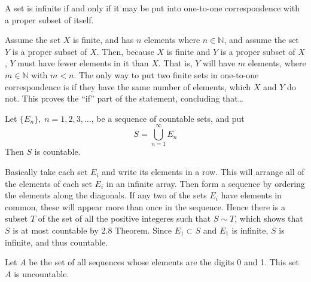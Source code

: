 \begin{prop-dan}
  A set is infinite if and only if it may be put into one-to-one correspondence with a proper subset of itself.
\end{prop-dan}

\begin{proof-dan}
  Assume the set $X$ is finite, and has $n$ elements where $n\in\mathbb{N}$, and assume the set $Y$ is a proper subset of $X$.
  Then, because $X$ is finite and $Y$ is a proper subset of $X$, $Y$ must have fewer elements in it than $X$.
  That is, $Y$ will have $m$ elements, where $m\in\mathbb{N}$ with $m<n$.
  The only way to put two finite sets in one-to-one correspondence is if they have the same number of elements, which $X$ and $Y$ do not.
  This proves the ``if'' part of the statement, concluding that\ldots
\end{proof-dan}

\begin{thm-dan}[2.12]
  Let $\{E_{n}\},\;n=1,2,3,\dots$, be a sequence of countable sets, and put
  \begin{equation*}
    S=\bigcup_{n=1}^{\infty}E_{n}
  \end{equation*}
  Then $S$ is countable.
\end{thm-dan}

\begin{proof-dan}
  Basically take each set $E_{i}$ and write its elements in a row.
  This will arrange all of the elements of each set $E_{i}$ in an infinite array.
  Then form a sequence by ordering the elements along the diagonals.
  If any two of the sets $E_{i}$ have elements in common, these will appear more than once in the sequence.
  Hence there is a subset $T$ of the set of all the positive integeres such that $S\sim T$, which shows that $S$ is at most countable by 2.8 Theorem.
  Since $E_{1}\subset S$ and $E_{1}$ is infinite, $S$ is infinite, and thus countable.
\end{proof-dan}

\begin{thm-dan}[2.14]
  Let $A$ be the set of all sequences whose elements are the digits 0 and 1.
  This set $A$ is uncountable.
\end{thm-dan}

